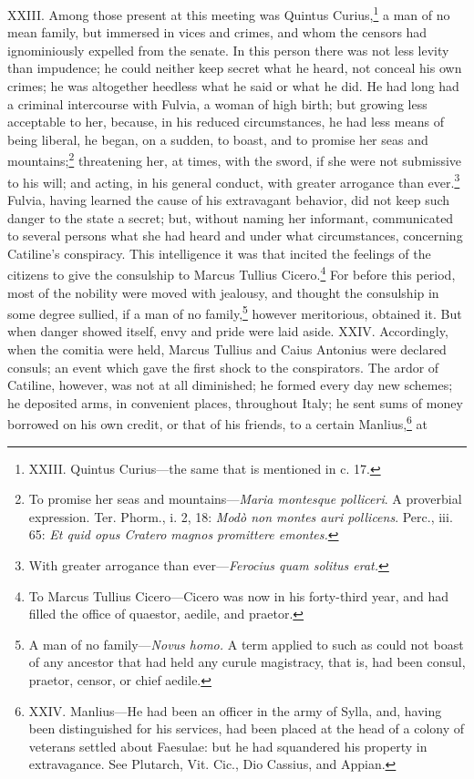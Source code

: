 XXIII. Among those present at this meeting was Quintus Curius,\footnote{XXIII. Quintus Curius—the same that is mentioned in c. 17.} a
man of no mean family, but immersed in vices and crimes, and whom the
censors had ignominiously expelled from the senate. In this person
there was not less levity than impudence; he could neither keep secret
what he heard, not conceal his own crimes; he was altogether heedless
what he said or what he did. He had long had a criminal intercourse
with Fulvia, a woman of high birth; but growing less acceptable to her,
because, in his reduced circumstances, he had less means of being
liberal, he began, on a sudden, to boast, and to promise her seas and
mountains;\footnote{To promise her seas and mountains—\emph{Maria montesque polliceri}.
A proverbial expression. Ter. Phorm., i. 2, 18: \emph{Modò non montes auri
pollicens}. Perc., iii. 65: \emph{Et quid opus Cratero magnos promittere
emontes.}} threatening her, at times, with the sword, if she were
not submissive to his will; and acting, in his general conduct, with
greater arrogance than ever.\footnote{With greater arrogance than ever—\emph{Ferocius quam solitus erat.}} Fulvia, having learned the cause of
his extravagant behavior, did not keep such danger to the state a
secret; but, without naming her informant, communicated to several
persons what she had heard and under what circumstances, concerning
Catiline's conspiracy. This intelligence it was that incited the
feelings of the citizens to give the consulship to Marcus Tullius
Cicero.\footnote{To Marcus Tullius Cicero—Cicero was now in his forty-third
year, and had filled the office of quaestor, aedile, and praetor.} For before this period, most of the nobility were moved
with jealousy, and thought the consulship in some degree sullied, if a
man of no family,\footnote{A man of no family—\emph{Novus homo.} A term applied to such as
could not boast of any ancestor that had held any curule magistracy,
that is, had been consul, praetor, censor, or chief aedile.} however meritorious, obtained it. But when
danger showed itself, envy and pride were laid aside. XXIV.
Accordingly, when the comitia were held, Marcus Tullius and Caius
Antonius were declared consuls; an event which gave the first shock to
the conspirators. The ardor of Catiline, however, was not at all
diminished; he formed every day new schemes; he deposited arms, in
convenient places, throughout Italy; he sent sums of money borrowed on
his own credit, or that of his friends, to a certain Manlius,\footnote{XXIV. Manlius—He had been an officer in the army of Sylla,
and, having been distinguished for his services, had been placed at
the head of a colony of veterans settled about Faesulae: but he had
squandered his property in extravagance. See Plutarch, Vit. Cic., Dio
Cassius, and Appian.} at
